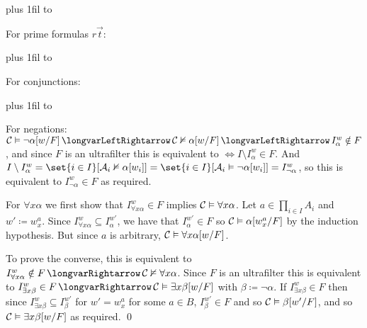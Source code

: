 \medskip
{\tabskip=0pt plus 1fil
\halign to}
\medskip

For prime formulas $r\vec t$:

\medskip
{\tabskip=0pt plus 1fil
\halign to}
\medskip

For conjunctions:

\medskip
{\tabskip=0pt plus 1fil
\halign to}
\medskip

For negations: ${\cal C}\vDash\neg\alpha[w/F]\iff{\cal C}\nvDash\alpha[w/F]\iff I^w_\alpha\notin F$, and since $F$ is an ultrafilter this is equivalent to $\iff I\setminus I^w_\alpha\in F$.
And $I\setminus I^w_\alpha=\set{i\in I}[{\cal A}_i\nvDash\alpha{[w_i]}]=\set{i\in I}[{\cal A}_i\vDash\neg\alpha{[w_i]}]=I^w_{\neg\alpha}$, so this is equivalent to $I^w_{\neg\alpha}\in F$ as required.

For $\forall x\alpha$ we first show that $I^w_{\forall x\alpha}\in F$ implies ${\cal C}\vDash\forall x\alpha$.
Let $a\in\prod_{i\in I}A_i$ and $w'\coloneqq w^a_x$.
Since $I^w_{\forall x\alpha}\subseteq I^{w'}_\alpha$, we have that $I^{w'}_\alpha\in F$ so ${\cal C}\vDash\alpha[w^a_x/F]$ by the induction hypothesis.
But since $a$ is arbitrary, ${\cal C}\vDash\forall x\alpha[w/F]$.

To prove the converse, this is equivalent to $I^w_{\forall x\alpha}\notin F\implies{\cal C}\nvDash\forall x\alpha$.
Since $F$ is an ultrafilter this is equivalent to $I^w_{\exists x\beta}\in F\implies{\cal C}\vDash\exists x\beta[w/F]$ with $\beta\coloneqq\neg\alpha$.
If $I^w_{\exists x\beta}\in F$ then since $I^w_{\exists x\beta}\subseteq I^{w'}_\beta$ for $w'=w^a_x$ for some $a\in B$, $I^{w'}_\beta\in F$ and so ${\cal C}\vDash\beta[w'/F]$, and so
${\cal C}\vDash\exists x\beta[w/F]$ as required.
\qed


